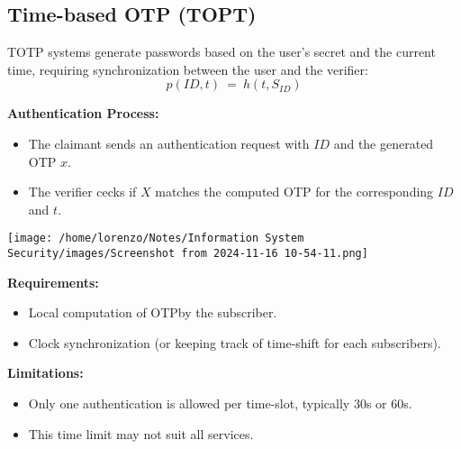 \subsection{Time-based OTP (TOPT)}
\begin{minipage}{0.5\textwidth}
    TOTP systems generate passwords based on the user's secret and the current time, requiring synchronization between the user and the verifier:
    \[p(ID,t)\ =\ h(t,S_{ID})\]
    \begin{customquote}
        \textbf{Authentication Process:}
        \begin{itemize}
            \item The claimant sends an authentication request with \(ID\) and the generated OTP \(x\).
            \item The verifier cecks if \(X\) matches the computed OTP for the corresponding \(ID\) and \(t\).
        \end{itemize}
    \end{customquote}
    

\end{minipage} 
\hspace{0.3cm}
\begin{minipage}{0.5\textwidth}
    \centering
    \texttt{[image: /home/lorenzo/Notes/Information System Security/images/Screenshot from 2024-11-16 10-54-11.png]}
\end{minipage}

\vspace{0.5cm}
\begin{customquote}
    \textbf{Requirements:}
    \begin{itemize}
        \item Local computation of OTPby the subscriber.
        \item Clock synchronization  (or keeping track of time-shift for each subscribers).
    \end{itemize}
\end{customquote}

\begin{customquote}
    \textbf{Limitations:}
    \begin{itemize}
        \item Only one authentication is allowed per time-slot, typically 30s or 60s.
        \item This time limit may not suit all services.
    \end{itemize}
\end{customquote}

